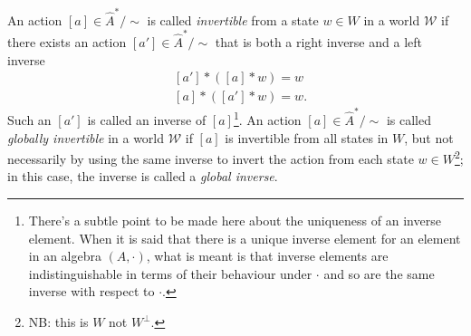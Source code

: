An action $[a] \in \hat{A}^{*}/\sim$ is called \emph{invertible} from a state $w \in W$ in a world $\mathscr{W}$ if there exists an action $[a'] \in \hat{A}^{*}/\sim$ that is both a right inverse and a left inverse
\begin{equation}
\begin{aligned}
    & [a'] * ([a] * w) = w \\
    & [a] * ([a'] * w) = w.
\end{aligned}
\end{equation}
Such an $[a']$ is called an inverse of $[a]$\footnote{
There's a subtle point to be made here about the uniqueness of an inverse element.
When it is said that there is a unique inverse element for an element in an algebra $(A, \cdot)$, what is meant is that inverse elements are indistinguishable in terms of their behaviour under $\cdot$ and so are the same inverse with respect to $\cdot$.
}.
An action $[a] \in \hat{A}^{*}/\sim$ is called \emph{globally invertible} in a world $\mathscr{W}$ if $[a]$ is invertible from all states in $W$, but not necessarily by using the same inverse to invert the action from each state $w \in W$\footnote{
NB: this is $W$ not $W^{\bot}$.
}; in this case, the inverse is called a \emph{global inverse}.

